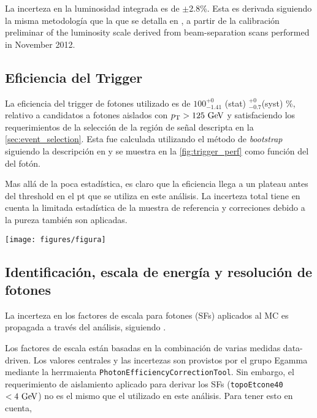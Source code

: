 La incerteza en la luminosidad integrada es de $\pm$2.8\%. %
Esta es derivada siguiendo la misma metodología que la que se detalla en \cite{lumi2011},
a partir de la calibración preliminar of the luminosity scale derived from beam-separation
scans performed in November 2012.


\subsection{Eficiencia del Trigger}\label{sec:trigger_eff}

La eficiencia del trigger de fotones utilizado {\trigchain} es de $100^{+0}_{-1.41}$ (stat) ${}^{+0}_{-0.7}$(syst) \%,
relativo a candidatos a fotones aislados con $\pt > 125 \gev$ y satisfaciendo los requerimientos
de la selección de la región de señal descripta en la \cref{sec:event_selection}.
Esta fue calculada utilizando el método de \emph{bootstrap} siguiendo la descripción en \cite{Damazio:1609629}
y se muestra en la {\fig} \ref{fig:trigger_perf} como función del {\pt} del fotón.

Mas allá de la poca estadística, es claro que la eficiencia llega a un plateau antes del threshold
en el pt que se utiliza en este análisis. La incerteza total tiene en cuenta la limitada estadística de
la muestra de referencia y correciones debido a la pureza también son aplicadas.

\begin{figure*}[ht!]
  \centering
  \texttt{[image: figures/figura]}
  \caption{Eficiencia del trigger para {\trigchain} como funcion del {\pt} del fotón,
    medida a partir de los datos.}
  \label{fig:trigger_perf}
\end{figure*}

\subsection{Identificación, escala de energía y resolución de fotones}\label{sec:syst_photonid}

La incerteza en los factores de escala para fotones (SFs) aplicados al MC es propagada
a través del análisis, siguiendo \cite{PhoEffTwiki}. %

Los factores de escala están basadas en la combinación de varias medidas data-driven.
Los valores centrales y las incertezas son provistos por el grupo Egamma mediante la herrmaienta
\texttt{PhotonEfficiencyCorrectionTool}. %
Sin embargo, el requerimiento de aislamiento aplicado para derivar los SFs
(\texttt{topoEtcone40} $< 4\gev$) no es el mismo que el utilizado en este análisis. Para tener esto
en cuenta,

